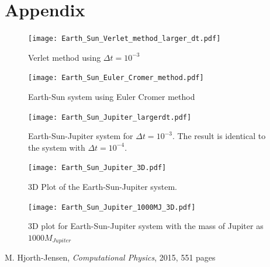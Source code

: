 \documentclass{article}
\begin{document}
\section{Appendix}
\begin{figure}[!h]
\centering
\texttt{[image: Earth\_Sun\_Verlet\_method\_larger\_dt.pdf]}
\caption{Verlet method using $\Delta t = 10^{-3}$}
\label{fig:balle3}
\end{figure}
\begin{figure}[!h]
\centering
\texttt{[image: Earth\_Sun\_Euler\_Cromer\_method.pdf]}
\caption{Earth-Sun system using Euler Cromer method}
\label{fig:Appendix_EulerCromer}
\end{figure}
\begin{figure}[!h]
\centering
\texttt{[image: Earth\_Sun\_Jupiter\_largerdt.pdf]}
\caption{Earth-Sun-Jupiter system for $\Delta t = 10^{-3}$. The result is identical to the system with $\Delta t = 10^{-4}$.}
\label{fig:ESJ_stability}
\end{figure}
\begin{figure}[!h]
\centering
\texttt{[image: Earth\_Sun\_Jupiter\_3D.pdf]}
\caption{3D Plot of the Earth-Sun-Jupiter system.}
\label{fig:Appendix_3D_ESJ}
\end{figure}
\begin{figure}[!h]
\centering
\texttt{[image: Earth\_Sun\_Jupiter\_1000MJ\_3D.pdf]}
\caption{3D plot for Earth-Sun-Jupiter system with the mass of Jupiter as $1000M_{Jupiter}$}
\label{fig:Appendix_1000MJ}
\end{figure}

\FloatBarrier
\begin{thebibliography}{1}
     M. Hjorth-Jensen, \emph{Computational Physics}, 2015, 551 pages
\end{thebibliography}
\end{document}

